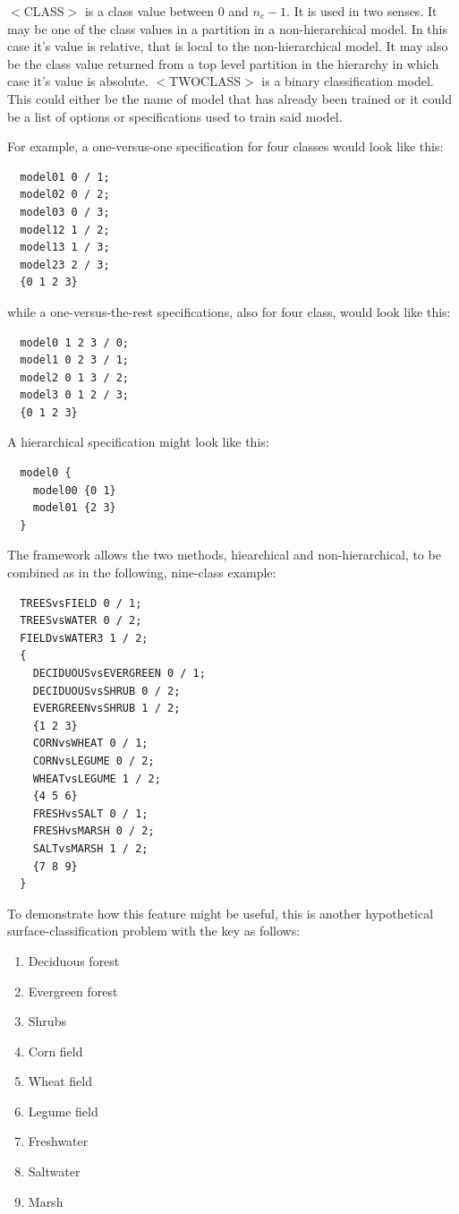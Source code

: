 \documentclass{article}
\begin{document}
$<$CLASS$>$ is a class value between 0 and $n_c-1$.  It is used in two senses.
It may be one of the class values in a partition in a non-hierarchical model.
In this case it's value is relative, that is local to the non-hierarchical model.
It may also be the class value returned
from a top level partition in the hierarchy in which case it's value is absolute.
$<$TWOCLASS$>$ is a binary classification model.
This could either be the name of model that has already been trained or it
could be a list of options or specifications used to train said model.

For example, a one-versus-one specification for four classes would look like
this:

\begin{verbatim}
  model01 0 / 1;
  model02 0 / 2;
  model03 0 / 3;
  model12 1 / 2;
  model13 1 / 3;
  model23 2 / 3;
  {0 1 2 3}
\end{verbatim}

while a one-versus-the-rest specifications, also for four class, would look
like this:

\begin{verbatim}
  model0 1 2 3 / 0;
  model1 0 2 3 / 1;
  model2 0 1 3 / 2;
  model3 0 1 2 / 3;
  {0 1 2 3}
\end{verbatim}

A hierarchical specification might look like this:

\begin{verbatim}
  model0 {
    model00 {0 1}
    model01 {2 3}
  }
\end{verbatim}

The framework allows the two methods,
 hiearchical and non-hierarchical, 
to be combined
as in the following, nine-class example:

\begin{verbatim}
  TREESvsFIELD 0 / 1;
  TREESvsWATER 0 / 2;
  FIELDvsWATER3 1 / 2;
  {
    DECIDUOUSvsEVERGREEN 0 / 1;
    DECIDUOUSvsSHRUB 0 / 2;
    EVERGREENvsSHRUB 1 / 2;
    {1 2 3}
    CORNvsWHEAT 0 / 1;
    CORNvsLEGUME 0 / 2;
    WHEATvsLEGUME 1 / 2;
    {4 5 6}
    FRESHvsSALT 0 / 1;
    FRESHvsMARSH 0 / 2;
    SALTvsMARSH 1 / 2;
    {7 8 9}
  }
\end{verbatim}

To demonstrate how this feature might be useful, this is another hypothetical 
surface-classification problem with the key as follows:
\begin{enumerate}
	\item Deciduous forest
	\item Evergreen forest
	\item Shrubs
	\item Corn field
	\item Wheat field
	\item Legume field
	\item Freshwater
	\item Saltwater
	\item Marsh
\end{enumerate}


\end{document}
